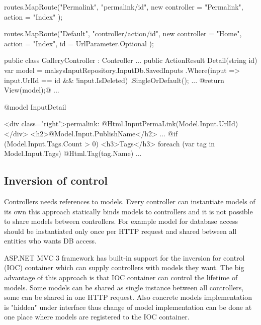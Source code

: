 \begin{Csharp}[label=code:routes,caption={Example of routes definition}]
routes.MapRoute("Permalink",
	"permalink/{id}",
	new { controller = "Permalink", action = "Index" }
);

routes.MapRoute("Default",
	 "{controller}/{action}/{id}",
	 new { controller = "Home", action = "Index", id = UrlParameter.Optional }
);
\end{Csharp}

\begin{Csharp}[label=code:controller,caption={The \emph{Detail} method of the \emph{Gallery} controller}]
public class GalleryController : Controller {
	...
	public ActionResult Detail(string id) {
		var model = malsysInputRepository.InputDb.SavedInputs
			.Where(input => input.UrlId == id && !input.IsDeleted)
			.SingleOrDefault();
		...
		@return View(model);@
	}
	...
}
\end{Csharp}

\begin{Razor}[label=code:view,caption={Gallery \emph{detail} view demonstrating the Razor syntax}]
@model InputDetail

<div class="right">permalink: @Html.InputPermaLink(Model.Input.UrlId)</div>
<h2>@Model.Input.PublishName</h2>
...
@if (Model.Input.Tags.Count > 0) {
	<h3>Tags</h3>
	foreach (var tag in Model.Input.Tags) {
		@Html.Tag(tag.Name)
	}
}
...
\end{Razor}

\subsection{Inversion of control}

Controllers needs references to models.
Every controller can instantiate models of its own this approach statically binds models to controllers and it is not possible to share models between controllers.
For example model for database access should be instantiated only once per HTTP request and shared between all entities who wants DB access.

ASP.NET MVC 3 framework has built-in support for the inversion for control (IOC) container which can supply controllers with models they want.
The big advantage of this approach is that IOC container can control the lifetime of models.
Some models can be shared as single instance between all controllers, some can be shared in one HTTP request.
Also concrete models implementation is "hidden" under interface thus change of model implementation can be done at one place where models are registered to the IOC container.

